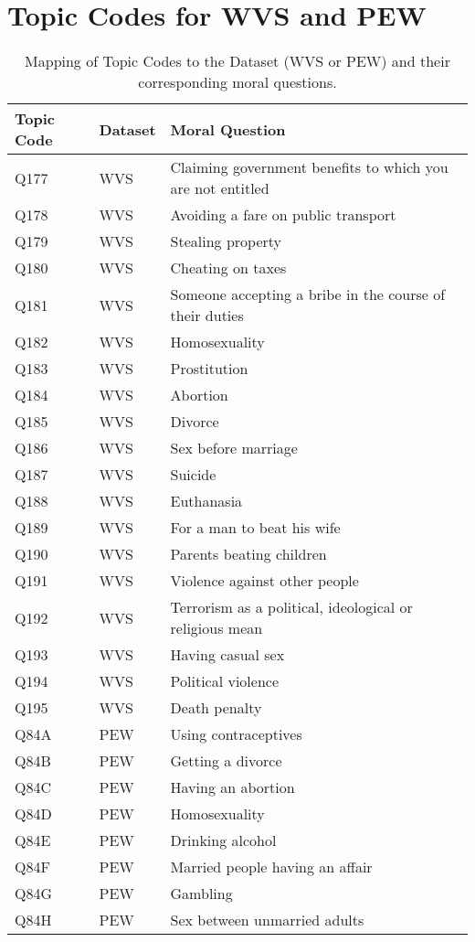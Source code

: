 \documentclass[11pt]{article}
\begin{document}
%


\appendix


\section{Topic Codes for WVS and PEW}
\label{appendix:topic_codes}

\begin{table}[ht]
\centering
\scriptsize
\renewcommand{\arraystretch}{1.1}
\caption{Mapping of Topic Codes to the Dataset (WVS or PEW) and their corresponding moral questions.}
\label{tab:topic_mapping}
\vspace{5pt}
\begin{tabular}{p{0.4cm}p{0.5cm}p{5.7cm}}
\toprule
\textbf{Topic Code} & \textbf{Dataset} & \textbf{Moral Question} \\ 
\midrule
Q177 & WVS & Claiming government benefits to which you are not entitled \\
Q178 & WVS & Avoiding a fare on public transport \\
Q179 & WVS & Stealing property \\
Q180 & WVS & Cheating on taxes \\
Q181 & WVS & Someone accepting a bribe in the course of their duties \\
Q182 & WVS & Homosexuality \\
Q183 & WVS & Prostitution \\
Q184 & WVS & Abortion \\
Q185 & WVS & Divorce \\
Q186 & WVS & Sex before marriage \\
Q187 & WVS & Suicide \\
Q188 & WVS & Euthanasia \\
Q189 & WVS & For a man to beat his wife \\
Q190 & WVS & Parents beating children \\
Q191 & WVS & Violence against other people \\
Q192 & WVS & Terrorism as a political, ideological or religious mean \\
Q193 & WVS & Having casual sex \\
Q194 & WVS & Political violence \\
Q195 & WVS & Death penalty \\
Q84A & PEW & Using contraceptives \\
Q84B & PEW & Getting a divorce \\
Q84C & PEW & Having an abortion \\
Q84D & PEW & Homosexuality \\
Q84E & PEW & Drinking alcohol \\
Q84F & PEW & Married people having an affair \\
Q84G & PEW & Gambling \\
Q84H & PEW & Sex between unmarried adults \\
\bottomrule
\end{tabular}
\end{table}
\end{document}
